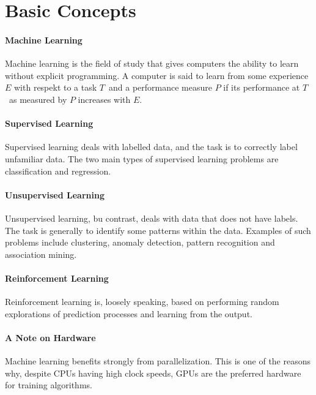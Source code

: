 \section{Basic Concepts}

\paragraph{Machine Learning}
Machine learning is the field of study that gives computers the ability to learn without explicit programming. A computer is said to learn from some experience $E$ with respekt to a task $T$ and a performance measure $P$ if its performance at $T$ as measured by $P$ increases with $E$.

\paragraph{Supervised Learning}
Supervised learning deals with labelled data, and the task is to correctly label unfamiliar data. The two main types of supervised learning problems are classification and regression.

\paragraph{Unsupervised Learning}
Unsupervised learning, bu contrast, deals with data that does not have labels. The task is generally to identify some patterns within the data. Examples of such problems include clustering, anomaly detection, pattern recognition and association mining.

\paragraph{Reinforcement Learning}
Reinforcement learning is, loosely speaking, based on performing random explorations of prediction processes and learning from the output.

\paragraph{A Note on Hardware}
Machine learning benefits strongly from parallelization. This is one of the reasons why, despite CPUs having high clock speeds, GPUs are the preferred hardware for training algorithms.

